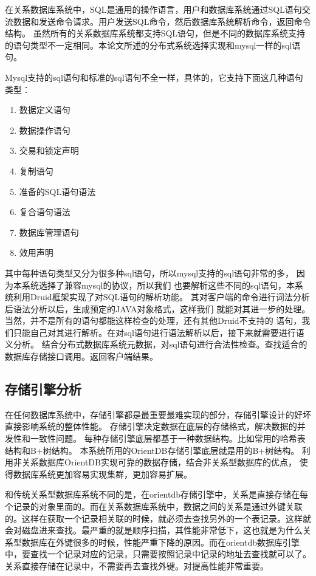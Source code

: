 在关系数据库系统中，SQL是通用的操作语言，用户和数据库系统通过SQL语句交流数据和发送命令请求。用户发送SQL命令，然后数据库系统解析命令，返回命令结构。
虽然所有的关系数据库系统都支持SQL语句，但是不同的数据库系统支持的语句类型不一定相同。本论文所述的分布式系统选择实现和mysql一样的sql语句。

Mysql支持的sql语句和标准的sql语句不全一样，具体的，它支持下面这几种语句类型：
\begin{enumerate}
\item 数据定义语句     
\item 数据操作语句     
\item 交易和锁定声明     
\item 复制语句     
\item 准备的SQL语句语法     
\item 复合语句语法     
\item 数据库管理语句     
\item 效用声明  
\end{enumerate}   
其中每种语句类型又分为很多种sql语句，所以mysql支持的sql语句非常的多，
因为本系统选择了兼容mysql的协议，所以我们
也要解析这些不同的sql语句，本系统利用Druid框架实现了对SQL语句的解析功能。
其对客户端的命令进行词法分析后语法分析以后，生成预定的JAVA对象格式，这样我们
就能对其进一步的处理。当然，并不是所有的语句都能这样检查的处理，还有其他Druid不支持的
语句，我们只能自己对其进行解析。在对sql语句进行语法解析以后，接下来就需要进行语义分析。
结合分布式数据库系统元数据，对sql语句进行合法性检查。查找适合的数据库存储接口调用。返回客户端结果。
\subsection{存储引擎分析}
在任何数据库系统中，存储引擎都是最重要最难实现的部分，存储引擎设计的好坏直接影响系统的整体性能。
存储引擎决定数据在底层的存储格式，解决数据的并发性和一致性问题。
每种存储引擎底层都基于一种数据结构。比如常用的哈希表结构和B+树结构。
本系统所用的OrientDB存储引擎底层就是用的B+树结构。
利用非关系数据库OrientDB实现可靠的数据存储，结合非关系型数据库的优点，
使得数据库系统更加容易实现集群，更加容易扩展。

和传统关系型数据库系统不同的是，在orientdb存储引擎中，关系是直接存储在每个记录的对象里面的。而在关系数据库系统中，数据之间的关系是通过外键关联的。这样在获取一个记录相关联的时候，就必须去查找另外的一个表记录。这样就会对磁盘进来查找。最严重的就是顺序扫描，其性能非常低下，这也就是为什么关系型数据库在外键很多的时候，性能严重下降的原因。而在orientdb数据库引擎中，要查找一个记录对应的记录，只需要按照记录中记录的地址去查找就可以了。关系直接存储在记录中，不需要再去查找外键。对提高性能非常重要。
